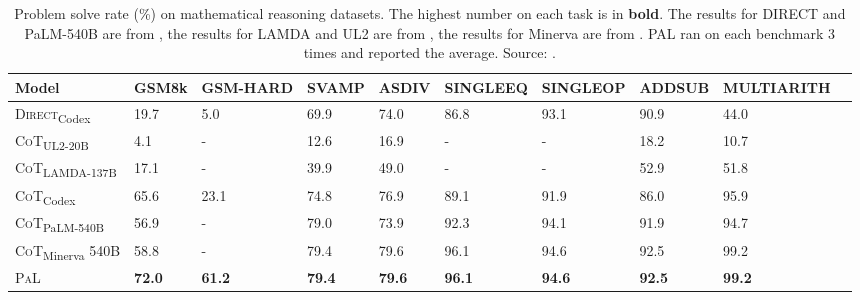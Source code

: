 \begin{table}[h!]
	\centering
	\tiny
	\begin{tabularx}{\textwidth}{XXXXXXXXXX}
		\hline
		\textbf{Model}                           & \textbf{GSM8k} & \textbf{GSM-HARD} & \textbf{SVAMP} & \textbf{ASDIV} & \textbf{SINGLEEQ} & \textbf{SINGLEOP} & \textbf{ADDSUB} & \textbf{MULTIARITH} \\ \hline
		\textsc{Direct}\textsubscript{Codex}     & 19.7           & 5.0               & 69.9           & 74.0           & 86.8              & 93.1              & 90.9            & 44.0                \\
		\textsc{CoT}\textsubscript{UL2-20B}      & 4.1            & -                 & 12.6           & 16.9           & -                 & -                 & 18.2            & 10.7                \\
		\textsc{CoT}\textsubscript{LAMDA-137B}   & 17.1           & -                 & 39.9           & 49.0           & -                 & -                 & 52.9            & 51.8                \\
		\textsc{CoT}\textsubscript{Codex}        & 65.6           & 23.1              & 74.8           & 76.9           & 89.1              & 91.9              & 86.0            & 95.9                \\
		\textsc{CoT}\textsubscript{PaLM-540B}    & 56.9           & -                 & 79.0           & 73.9           & 92.3              & 94.1              & 91.9            & 94.7                \\
		\textsc{CoT}\textsubscript{Minerva} 540B & 58.8           & -                 & 79.4           & 79.6           & 96.1              & 94.6              & 92.5            & 99.2                \\
		\textsc{PaL}                             & \textbf{72.0}  & \textbf{61.2}     & \textbf{79.4}  & \textbf{79.6}  & \textbf{96.1}     & \textbf{94.6}     & \textbf{92.5}   & \textbf{99.2}       \\ \hline
	\end{tabularx}
	\caption{Problem solve rate (\%) on mathematical reasoning datasets. The highest number on each task is in \textbf{bold}. The results for DIRECT and PaLM-540B are from \textcite{wei2022chain}, the results for LAMDA and UL2 are from \textcite{wang2022self}, the results for Minerva are from \textcite{lewkowycz2022minerva}. PAL ran on each benchmark 3 times and reported the average. Source: \textcite{gao2022pal}.}
	\label{tab:pal-math}
\end{table}
